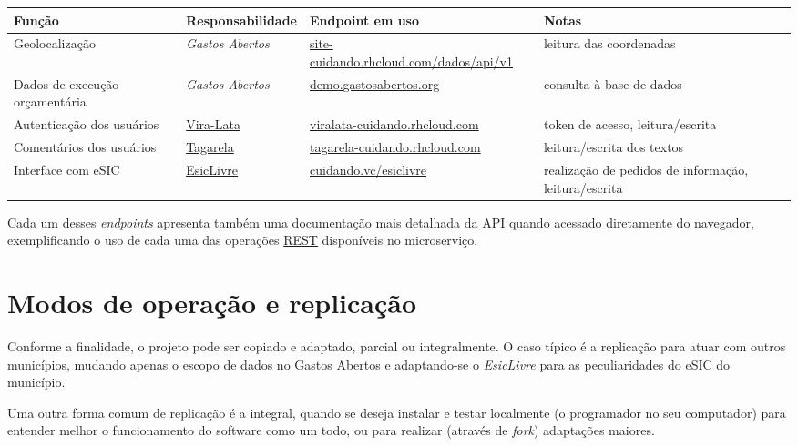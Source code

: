 \documentclass[letterpaper,10pt,english]{sphinxmanual}
\begin{document}
\begin{tabulary}{\linewidth}{|L|L|L|L|}
\hline
\textsf{\relax 
Função
} & \textsf{\relax 
Responsabilidade
} & \textsf{\relax 
\textbf{Endpoint} em uso
} & \textsf{\relax 
Notas
}\\
\hline
Geolocalização
 & 
\emph{Gastos Abertos}
 & 
\href{https://site-cuidando.rhcloud.com/dados/api/v1}{site-cuidando.rhcloud.com/dados/api/v1}
 & 
leitura das coordenadas
\\
\hline
Dados de execução orçamentária
 & 
\emph{Gastos Abertos}
 & 
\href{http://demo.gastosabertos.org}{demo.gastosabertos.org}
 & 
consulta à base de dados
\\
\hline
Autenticação dos usuários
 & 
\href{https://github.com/okfn-brasil/viralata}{Vira-Lata}
 & 
\href{https://viralata-cuidando.rhcloud.com}{viralata-cuidando.rhcloud.com}
 & 
token de acesso, leitura/escrita
\\
\hline
Comentários dos usuários
 & 
\href{https://github.com/okfn-brasil/tagarela}{Tagarela}
 & 
\href{https://tagarela-cuidando.rhcloud.com}{tagarela-cuidando.rhcloud.com}
 & 
leitura/escrita dos textos
\\
\hline
Interface com eSIC
 & 
\href{https://github.com/okfn-brasil/esiclivre}{EsicLivre}
 & 
\href{https://cuidando.vc/esiclivre}{cuidando.vc/esiclivre}
 & 
realização de pedidos de informação, leitura/escrita
\\
\hline\end{tabulary}


Cada um desses \emph{endpoints} apresenta também uma documentação mais
detalhada da API quando acessado diretamente do navegador,
exemplificando o uso de cada uma das operações
\href{https://en.wikipedia.org/wiki/Representational\_state\_transfer}{REST}
disponíveis no microserviço.


\chapter{Modos de operação e replicação}
\label{index:modos-de-operacao-e-replicacao}
Conforme a finalidade, o projeto pode ser copiado e adaptado, parcial ou
integralmente. O caso típico é a replicação para atuar com outros
municípios, mudando apenas o escopo de dados no Gastos Abertos e
adaptando-se o \emph{EsicLivre} para as peculiaridades do eSIC do município.

Uma outra forma comum de replicação é a integral, quando se deseja
instalar e testar localmente (o programador no seu computador) para
entender melhor o funcionamento do software como um todo, ou para
realizar (através de \emph{fork}) adaptações maiores.
\end{document}
